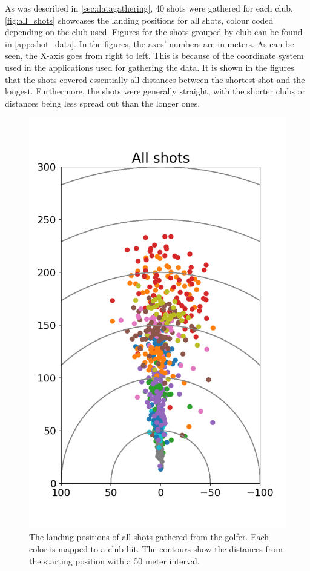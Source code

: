 \documentclass{kththesis}
\begin{document}
As was described in \autoref{sec:datagathering}, 40 shots were gathered for each club. \autoref{fig:all_shots} showcases the landing positions for all shots, colour coded depending on the club used. Figures for the shots grouped by club can be found in \autoref{app:shot_data}. In the figures, the axes' numbers are in meters. As can be seen, the X-axis goes from right to left. This is because of the coordinate system used in the applications used for gathering the data. It is shown in the figures that the shots covered essentially all distances between the shortest shot and the longest. Furthermore, the shots were generally straight, with the shorter clubs or distances being less spread out than the longer ones.

\begin{figure}
    \centering
    \includegraphics[height=0.4\textheight]{Shots/all_shots.png}
    \caption{The landing positions of all shots gathered from the golfer. Each color is mapped to a club hit. The contours show the distances from the starting position with a 50 meter interval.}
    \label{fig:all_shots}
\end{figure}
\end{document}
